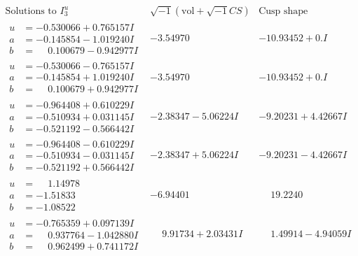 \documentclass[1p]{elsarticle_modified}
\theoremstyle{definition}
\newcommand{\I}{\sqrt{-1}}
\begin{document}
$$\begin{array}{c|c|c}  
\text{Solutions to }I^u_{3}& \I (\text{vol} + \sqrt{-1}CS) & \text{Cusp shape}\\
 \hline 
\begin{aligned}
u &= -0.530066 + 0.765157 I \\
a &= -0.145854 - 1.019240 I \\
b &= \phantom{-}0.100679 - 0.942977 I\end{aligned}
 & -3.54970\phantom{ +0.000000I} & -10.93452 + 0. I\phantom{ +0.000000I} \\ \hline\begin{aligned}
u &= -0.530066 - 0.765157 I \\
a &= -0.145854 + 1.019240 I \\
b &= \phantom{-}0.100679 + 0.942977 I\end{aligned}
 & -3.54970\phantom{ +0.000000I} & -10.93452 + 0. I\phantom{ +0.000000I} \\ \hline\begin{aligned}
u &= -0.964408 + 0.610229 I \\
a &= -0.510934 + 0.031145 I \\
b &= -0.521192 - 0.566442 I\end{aligned}
 & -2.38347 - 5.06224 I & -9.20231 + 4.42667 I \\ \hline\begin{aligned}
u &= -0.964408 - 0.610229 I \\
a &= -0.510934 - 0.031145 I \\
b &= -0.521192 + 0.566442 I\end{aligned}
 & -2.38347 + 5.06224 I & -9.20231 - 4.42667 I \\ \hline\begin{aligned}
u &= \phantom{-}1.14978\phantom{ +0.000000I} \\
a &= -1.51833\phantom{ +0.000000I} \\
b &= -1.08522\phantom{ +0.000000I}\end{aligned}
 & -6.94401\phantom{ +0.000000I} & \phantom{-}19.2240\phantom{ +0.000000I} \\ \hline\begin{aligned}
u &= -0.765359 + 0.097139 I \\
a &= \phantom{-}0.937764 - 1.042880 I \\
b &= \phantom{-}0.962499 + 0.741172 I\end{aligned}
 & \phantom{-}9.91734 + 2.03431 I & \phantom{-}1.49914 - 4.94059 I \\ \hline\begin{aligned}

\end{aligned}
\end{array}$$
\end{document}
